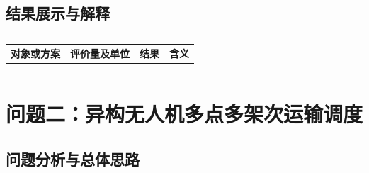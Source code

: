 \subsection{结果展示与解释}
\begin{table}[htbp]
	\centering
	\caption{}
	\label{tab:results}
	\begin{tabularx}{\linewidth}{Y Y Y Y}
		\toprule
		对象或方案 & 评价量及单位 & 结果 & 含义 \\
		\midrule
		 &  &  &  \\
		 &  &  &  \\
		\bottomrule
	\end{tabularx}
\end{table}
\FloatBarrier
{}


\newcommand{\QTwoIter}{800}
\newcommand{\QTwoSeed}{20260924}

\newcommand{\QTwoInitTrips}{25}
\newcommand{\QTwoInitMakespan}{13017.522}
\newcommand{\QTwoInitEnergy}{82.8946}
\newcommand{\QTwoInitLate}{139.3771}

\newcommand{\QTwoTrips}{19}
\newcommand{\QTwoMakespan}{9590.134}
\newcommand{\QTwoMakespanHour}{2.664}
\newcommand{\QTwoEnergy}{64.9654}
\newcommand{\QTwoLate}{6.0770}
\newcommand{\QTwoHardViolation}{0}
\newcommand{\QTwoMinSOC}{20.74\%}
\newcommand{\QTwoSoftLateNum}{3}

\newcommand{\QTwoLateImprove}{95.64\%}
\newcommand{\QTwoMakespanImprove}{26.33\%}
\newcommand{\QTwoEnergyImprove}{21.63\%}
\newcommand{\QTwoTripsImprove}{24.00\%}

\section{问题二：异构无人机多点多架次运输调度}
\label{sec:q2}

\subsection{问题分析与总体思路}

